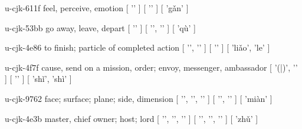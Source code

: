 \begin{multicols}{2}
\cjkgGlue{} u-cjk-611f  feel, perceive, emotion  [ '\cjkgGlue{}' ]  [ '\cjkgGlue{}' ]  [ 'g{\mktsRsgFb{}ǎ}n' ] 

\cjkgGlue{} u-cjk-53bb  go away, leave, depart  [ '\cjkgGlue{}' ]  [ '\cjkgGlue{}', '\cjkgGlue{}' ]  [ 'qù' ] 

\cjkgGlue{} u-cjk-4e86  to finish; particle of completed action  [ '\cjkgGlue{}', '\cjkgGlue{}' ]  [ '\cjkgGlue{}' ]  [ 'li{\mktsRsgFb{}ǎ}o', 'le' ] 

\cjkgGlue{} u-cjk-4f7f  cause, send on a mission, order; envoy, messenger, ambassador  [ '\cjkgGlue{}(\cjkgGlue{}|\cjkgGlue{})', '\cjkgGlue{}' ]  [ '\cjkgGlue{}' ]  [ 'sh{\mktsRsgFb{}ǐ}', 'shì' ] 

\cjkgGlue{} u-cjk-9762  face; surface; plane; side, dimension  [ '\cjkgGlue{}', '\cjkgGlue{}', '\cjkgGlue{}' ]  [ '\cjkgGlue{}', '\cjkgGlue{}' ]  [ 'miàn' ] 

\cjkgGlue{} u-cjk-4e3b  master, chief owner; host; lord  [ '\cjkgGlue{}', '\cjkgGlue{}', '\cjkgGlue{}' ]  [ '\cjkgGlue{}', '\cjkgGlue{}', '\cjkgGlue{}' ]  [ 'zh{\mktsRsgFb{}ǔ}' ] 


\end{multicols}

